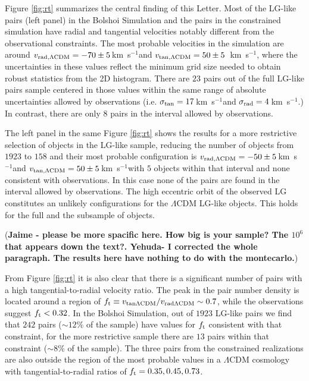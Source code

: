\documentclass{emulateapj}
\newcommand{\kms}{\,km~s$^{-1}$}
\begin{document}
Figure \ref{fig:rt} summarizes the central finding of this Letter. Most of the LG-like pairs (left panel) in the Bolshoi Simulation and the pairs in the constrained simulation have radial and tangential velocities notably different from the observational constraints.  The most probable velocities in the simulation are around $v_{\rm rad,\Lambda CDM} = -70\pm5$\kms and $v_{\rm tan,\Lambda CDM} = 50\pm5$ \kms, where the uncertainties in these values reflect the minimum grid size needed to obtain robust statistics from the 2D histogram. There are $23$ pairs out of the full LG-like pairs sample centered in those values within the same range of absolute uncertainties allowed by observations (i.e. $\sigma_{\rm tan}=17$\kms and $\sigma_{\rm rad}=4$\kms.) In contrast, there are only $8$ pairs in the interval allowed by observations. 

The left panel in the same Figure \ref{fig:rt} shows the results for a more restrictive selection of objects in the LG-like sample, reducing the number of objects from  $1923$   to $158$ and their most probable configuration is $v_{\rm rad,\Lambda CDM} = -50\pm5$\kms and $v_{\rm tan,\Lambda CDM} = 50\pm5$\kms with $5$ objects within that interval and none consistent with observations. In this case none of the pairs are found in the interval allowed by observations. The high eccentric orbit of the observed LG  constitutes an unlikely configurations for the $\Lambda$CDM LG-like objects. This holds for the full and the subsample of objects. 


({\bf Jaime - please be more spacific here. How big is your sample? The $10^6$ that appears down the text?. Yehuda- I corrected the whole paragraph. The results here have nothing to do with the montecarlo.})

From Figure \ref{fig:rt} it is also clear that there is a significant number of pairs with a high tangential-to-radial velocity ratio. The peak in the pair number density is located around a region of $f_{\rm t}\equiv v_{\rm tan \Lambda CDM}/v_{\rm rad \Lambda CDM}\sim 0.7$, while the observations suggest $f_{\rm t}<0.32$. In the Bolshoi Simulation, out of $1923$ LG-like pairs we find that $242$ pairs ($\sim 12\%$ of the sample) have values for $f_{\rm t}$ consistent with that constraint, for the more restrictive sample there are $13$ pairs within that constraint ($\sim 8\%$ of the sample). The three pairs from the constrained realizations are also outside the region of the most probable values in a $\Lambda$CDM cosmology with tangential-to-radial ratios of $f_{\rm t}= 0.35, 0.45, 0.73$.
\end{document}
